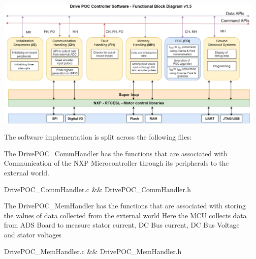 \begin{DoxyImageNoCaption}
  \mbox{\includegraphics[width=\textwidth,height=\textheight/2,keepaspectratio=true]{software_func_block_dia.jpg}}
\end{DoxyImageNoCaption}




The software implementation is split across the following files\+:

The Drive\+POC\+\_\+\+Comm\+Handler has the functions that are associated with Communication of the NXP Microcontroller through its peripherals to the external world. \begin{DoxyVerb}DrivePOC_CommHandler.c && DrivePOC_CommHandler.h
\end{DoxyVerb}


The Drive\+POC\+\_\+\+Mem\+Handler has the functions that are associated with storing the values of data collected from the external world Here the MCU collects data from ADS Board to measure stator current, DC Bus current, DC Bus Voltage and stator voltages \begin{DoxyVerb}DrivePOC_MemHandler.c && DrivePOC_MemHandler.h
\end{DoxyVerb}


